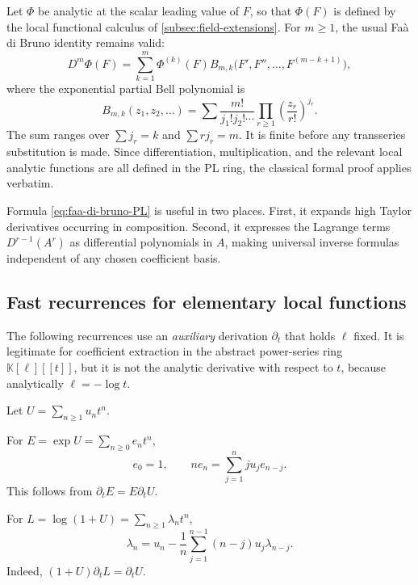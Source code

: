 \documentclass[11pt,oneside]{article}
\numberwithin{equation}{section}
\theoremstyle{definition}
\newcommand{\K}{\mathbb{K}}
\begin{document}
Let \(\Phi\) be analytic at the scalar leading value of \(F\), so that
\(\Phi(F)\) is defined by the local functional calculus of
\cref{subsec:field-extensions}.  For \(m\ge1\), the usual Fa\`a di Bruno
identity remains valid:
\begin{equation}\label{eq:faa-di-bruno-PL}
  D^m\Phi(F)
   =\sum_{k=1}^{m}\Phi^{(k)}(F)
      B_{m,k}\bigl(F',F'',\ldots,F^{(m-k+1)}\bigr),
\end{equation}
where the exponential partial Bell polynomial is
\begin{equation}\label{eq:exponential-Bell-definition}
 B_{m,k}(z_1,z_2,\ldots)
 =\sum
   \frac{m!}{j_1!j_2!\cdots}
   \prod_{r\ge1}\left(\frac{z_r}{r!}\right)^{j_r}.
\end{equation}
The sum ranges over \(\sum j_r=k\) and \(\sum rj_r=m\).  It is finite before
any transseries substitution is made.  Since differentiation, multiplication,
and the relevant local analytic functions are all defined in the PL ring, the
classical formal proof applies verbatim.

Formula \eqref{eq:faa-di-bruno-PL} is useful in two places.  First, it expands
high Taylor derivatives occurring in composition.  Second, it expresses the
Lagrange terms \(D^{r-1}(A^r)\) as differential polynomials in \(A\), making
universal inverse formulas independent of any chosen coefficient basis.

\subsection{Fast recurrences for elementary local functions}

The following recurrences use an \emph{auxiliary} derivation
\(\partial_t\) that holds \(\ell\) fixed.  It is legitimate for coefficient
extraction in the abstract power-series ring \(\K[\ell][[t]]\), but it is not
the analytic derivative with respect to \(t\), because analytically
\(\ell=-\log t\).

Let \(U=\sum_{n\ge1}u_nt^n\).

For \(E=\exp U=\sum_{n\ge0}e_nt^n\),
\begin{equation}\label{eq:exp-coefficient-recurrence}
  e_0=1,
  \qquad
  ne_n=\sum_{j=1}^{n}j u_j e_{n-j}.
\end{equation}
This follows from \(\partial_tE=E\partial_tU\).

For \(L=\log(1+U)=\sum_{n\ge1}\lambda_nt^n\),
\begin{equation}\label{eq:log-coefficient-recurrence}
  \lambda_n=u_n-\frac1n
  \sum_{j=1}^{n-1}(n-j)u_j\lambda_{n-j}.
\end{equation}
Indeed, \((1+U)\partial_tL=\partial_tU\).
\end{document}
